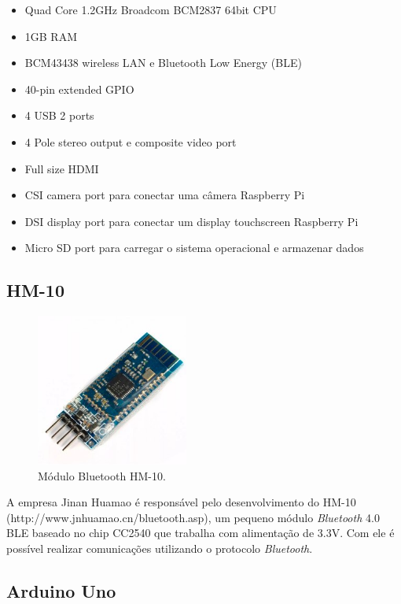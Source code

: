 \documentclass[
	12pt,				%
	oneside,			%
	a4paper,			%
	brazil				%
]{abntex2}
\begin{document}
{\begin{itemize}
\item Quad Core 1.2GHz Broadcom BCM2837 64bit CPU
\item 1GB RAM
\item BCM43438 wireless LAN e Bluetooth Low Energy (BLE)
\item 40-pin extended GPIO
\item 4 USB 2 ports
\item 4 Pole stereo output e composite video port
\item Full size HDMI
\item CSI camera port para conectar uma câmera Raspberry Pi
\item DSI display port para conectar um display touchscreen Raspberry Pi
\item Micro SD port para carregar o sistema operacional e armazenar dados
\end{itemize}


\subsection{HM-10}

\begin{figure}[!h]
\centering
\includegraphics[width=5cm, center]{images/hm-10}
\caption{Módulo Bluetooth HM-10.}
\label{Rotulo}
\end{figure}

A empresa Jinan Huamao é responsável pelo desenvolvimento do HM-10 (http://www.jnhuamao.cn/bluetooth.asp), um pequeno módulo \textit{Bluetooth} 4.0 BLE baseado no chip CC2540 que trabalha com alimentação de 3.3V. Com ele é possível realizar comunicações utilizando o protocolo \textit{Bluetooth}.

\newpage

\subsection{Arduino Uno}

}
\end{document}
